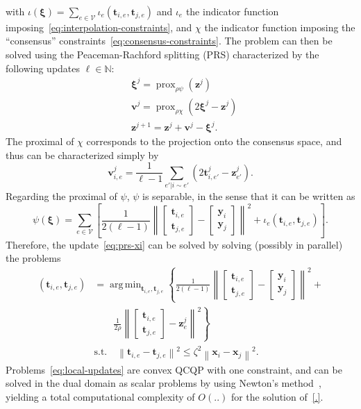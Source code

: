 \documentclass{article}
\DeclareMathOperator*{\argmin}{arg\,min}
\DeclareMathOperator{\prox}{prox}
\newcommand{\norm}[1]{\left\lVert#1\right\rVert}
\newcommand{\tv}{\mathbold{t}}
\newcommand{\x}{\mathbold{x}}
\newcommand{\y}{\mathbold{y}}
\newcommand{\vv}{\mathbold{v}}
\newcommand{\z}{\mathbold{z}}
\newcommand{\xx}{\pmb{\xi}}
\newcommand{\andrea}[1]{{\color{red}[#1]}}
\begin{document}
with $\iota(\xx) = \sum_{e \in \mathcal{V}} \iota_{e}(\tv_{i,e},\tv_{j,e})$ and $\iota_e$ the indicator function imposing~\eqref{eq:interpolation-constraints}, and $\chi$ the indicator function imposing the ``consensus'' constraints~\eqref{eq:consensus-constraints}. The problem can then be solved using the Peaceman-Rachford splitting (PRS) characterized by the following updates $\ell \in \mathbb{N}$:
\begin{subequations}
\begin{align}
	&\xx^j = \prox_{\rho \psi}(\z^j) \label{eq:prs-xi} \\
	&\vv^j = \prox_{\rho \chi}(2 \xx^j - \z^j) \\
	&\z^{j+1} = \z^j + \vv^j - \xx^j.
\end{align}
\end{subequations}
The proximal of $\chi$ corresponds to the projection onto the consensus space, and thus can be characterized simply by
$$
	\vv_{i,e}^j = \frac{1}{\ell-1} \sum_{e' | i \sim e'} \left( 2 \tv_{i,e'}^j - \z_{e'}^j\right).
$$
Regarding the proximal of $\psi$, $\psi$ is separable, in the sense that it can be written as
$$
	\psi(\xx) = \sum_{e \in \mathcal{V}} \left[ \frac{1}{2 (\ell-1)} \norm{\begin{bmatrix} \tv_{i,e} \\ \tv_{j,e} \end{bmatrix} - \begin{bmatrix} \y_i \\ \y_j \end{bmatrix}}^2 + \iota_{e}(\tv_{i,e},\tv_{j,e}) \right].
$$
Therefore, the update~\eqref{eq:prs-xi} can be solved by solving (possibly in parallel) the problems
\begin{equation}\label{eq:local-updates}
\begin{split}
	(\tv_{i,e},\tv_{j,e}) &= \argmin_{\tv_{i,e},\tv_{j,e}} \left\{ \frac{1}{2 (\ell-1)} \norm{\begin{bmatrix} \tv_{i,e} \\ \tv_{j,e} \end{bmatrix} - \begin{bmatrix} \y_i \\ \y_j \end{bmatrix}}^2 + \right.\\ & \left.\qquad \frac{1}{2\rho} \norm{\begin{bmatrix} \tv_{i,e} \\ \tv_{j,e} \end{bmatrix} - \z_e^j}^2 \right\}\\
	&\text{s.t.} \quad \norm{\tv_{i,e} - \tv_{j,e}}^2 \leq \zeta^2 \norm{\x_i - \x_j}^2.
\end{split}
\end{equation}
Problems~\eqref{eq:local-updates} are convex QCQP with one constraint, and can be solved in the dual domain as scalar problems by using Newton's method~\cite{.}, yielding a total computational complexity of $O(..)$ for the solution of~\eqref{.}.
\end{document}
